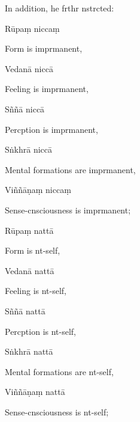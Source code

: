 \begin{english}
  In addition, he frthr nstrcted:
\end{english}

Rūpaṃ niccaṃ

\begin{english}
  Form is imprmanent,
\end{english}

Vedanā niccā

\begin{english}
  Feeling is imprmanent,
\end{english}

Sññā niccā

\begin{english}
  Percption is imprmanent,
\end{english}

Sṅkhrā niccā

\begin{english}
  Mental formations are imprmanent,
\end{english}

Viññāṇaṃ niccaṃ

\begin{english}
  Sense-cnsciousness is imprmanent;
\end{english}

Rūpaṃ nattā

\begin{english}
  Form is nt-self,
\end{english}

Vedanā nattā

\begin{english}
  Feeling is nt-self,
\end{english}

Sññā nattā

\begin{english}
  Percption is nt-self,
\end{english}

Sṅkhrā nattā

\begin{english}
  Mental formations are nt-self,
\end{english}

Viññāṇaṃ nattā

\begin{english}
  Sense-cnsciousness is nt-self;
\end{english}

